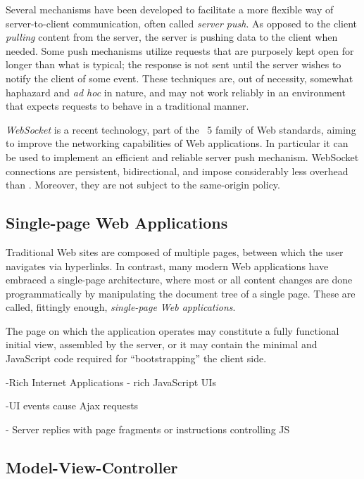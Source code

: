 Several mechanisms have been developed to facilitate a more flexible way of server-to-client communication, often called \emph{server push}. As opposed to the client \emph{pulling} content from the server, the server is pushing data to the client when needed. Some push mechanisms utilize  requests that are purposely kept open for longer than what is typical; the response is not sent until the server wishes to notify the client of some event. These techniques are, out of necessity, somewhat haphazard and \emph{ad hoc} in nature, and may not work reliably in an environment that expects  requests to behave in a traditional manner.

\emph{WebSocket} is a recent technology, part of the ~5 family of Web standards, aiming to improve the networking capabilities of Web applications. In particular it can be used to implement an efficient and reliable server push mechanism. WebSocket connections are persistent, bidirectional, and impose considerably less overhead than . Moreover, they are not subject to the same-origin policy.

\subsection{Single-page Web Applications}

Traditional Web sites are composed of multiple pages, between which the user navigates via hyperlinks. In contrast, many modern Web applications have embraced a single-page architecture, where most or all content changes are done programmatically by manipulating the document tree of a single  page. These are called, fittingly enough, \emph{single-page Web applications}.

The page on which the application operates may constitute a fully functional initial view, assembled by the server, or it may contain the minimal  and JavaScript code required for ``bootstrapping'' the client side.



-Rich Internet Applications - rich JavaScript UIs



-UI events cause Ajax requests

- Server replies with page fragments or instructions controlling JS


\subsection{Model-View-Controller}

